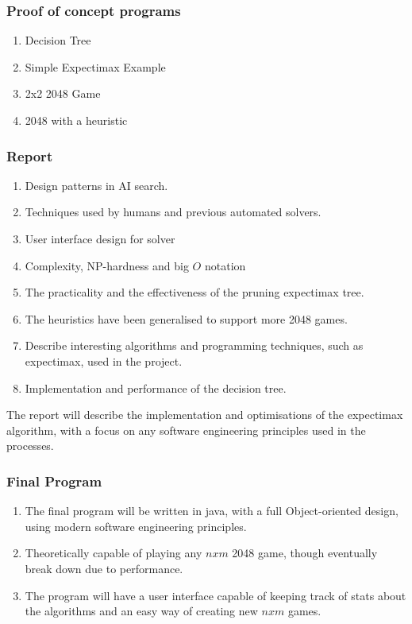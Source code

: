 \documentclass{article}
\begin{document}
\subsubsection{Proof of concept programs}
\begin{enumerate}
    \item Decision Tree
    \item Simple Expectimax Example
    \item 2x2 2048 Game
    \item 2048 with a heuristic
\end{enumerate}
\subsubsection{Report}
\begin{enumerate}
    \item Design patterns in AI search.
    \item Techniques used by humans and previous automated solvers.
    \item User interface design for solver
    \item Complexity, NP-hardness and big $O$ notation
    \item The practicality and the effectiveness of the pruning expectimax tree.
    \item The heuristics have been generalised to support more 2048 games.
    \item Describe interesting algorithms and programming techniques, such as expectimax, used in the project.
    \item Implementation and performance of the decision tree.    
\end{enumerate}
The report will describe the implementation and optimisations of the expectimax algorithm, with a focus on any software engineering principles used in the processes. 
\subsubsection{Final Program}
\begin{enumerate}
    \item The final program will be written in java, with a full Object-oriented design, using modern software engineering principles.
    \item Theoretically capable of playing any $nxm$ 2048 game, though eventually break down due to performance.
    \item The program will have a user interface capable of keeping track of stats about the algorithms and an easy way of creating new $nxm$ games.
\end{enumerate}
\end{document}
